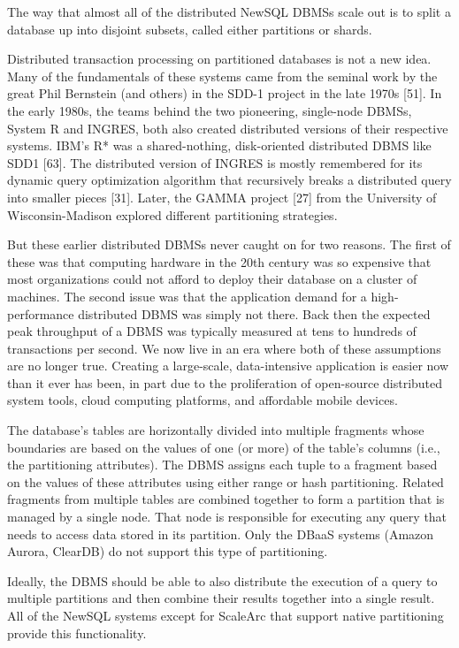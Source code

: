 \documentclass[a4paper,12pt,notitlepage,twoside,openright]{article}
\begin{document}
The way that almost all of the distributed NewSQL DBMSs scale out is to
split a database up into disjoint subsets, called either partitions or
shards.

Distributed transaction processing on partitioned databases is not a new
idea. Many of the fundamentals of these systems came from the seminal
work by the great Phil Bernstein (and others) in the SDD-1 project in
the late 1970s {[}51{]}. In the early 1980s, the teams behind the two
pioneering, single-node DBMSs, System R and INGRES, both also created
distributed versions of their respective systems. IBM's R* was a
shared-nothing, disk-oriented distributed DBMS like SDD1 {[}63{]}. The
distributed version of INGRES is mostly remembered for its dynamic query
optimization algorithm that recursively breaks a distributed query into
smaller pieces {[}31{]}. Later, the GAMMA project {[}27{]} from the
University of Wisconsin-Madison explored different partitioning
strategies.

But these earlier distributed DBMSs never caught on for two reasons. The
first of these was that computing hardware in the 20th century was so
expensive that most organizations could not afford to deploy their
database on a cluster of machines. The second issue was that the
application demand for a high-performance distributed DBMS was simply
not there. Back then the expected peak throughput of a DBMS was
typically measured at tens to hundreds of transactions per second. We
now live in an era where both of these assumptions are no longer true.
Creating a large-scale, data-intensive application is easier now than it
ever has been, in part due to the proliferation of open-source
distributed system tools, cloud computing platforms, and affordable
mobile devices.

The database's tables are horizontally divided into multiple fragments
whose boundaries are based on the values of one (or more) of the table's
columns (i.e., the partitioning attributes). The DBMS assigns each tuple
to a fragment based on the values of these attributes using either range
or hash partitioning. Related fragments from multiple tables are
combined together to form a partition that is managed by a single node.
That node is responsible for executing any query that needs to access
data stored in its partition. Only the DBaaS systems (Amazon Aurora,
ClearDB) do not support this type of partitioning.

Ideally, the DBMS should be able to also distribute the execution of a
query to multiple partitions and then combine their results together
into a single result. All of the NewSQL systems except for ScaleArc that
support native partitioning provide this functionality.
\end{document}
